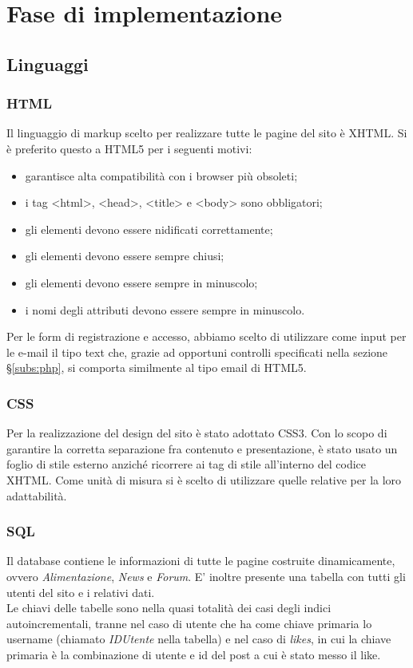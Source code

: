\section{Fase di implementazione}
\subsection{Linguaggi}
\subsubsection{HTML}
Il linguaggio di markup scelto per realizzare tutte le pagine del sito è XHTML. Si è preferito questo a HTML5 per i seguenti motivi:
\begin{itemize}
    \item garantisce alta compatibilità con i browser più obsoleti;
    \item i tag <html>, <head>, <title> e <body> sono obbligatori;
	\item gli elementi devono essere nidificati correttamente;
	\item gli elementi devono essere sempre chiusi;
	\item gli elementi devono essere sempre in minuscolo;
	\item i nomi degli attributi devono essere sempre in minuscolo.
\end{itemize}

Per le form di registrazione e accesso, abbiamo scelto di utilizzare come input per le e-mail il tipo text che, grazie ad opportuni controlli specificati nella sezione \S\ref{subs:php}, 
si comporta similmente al tipo email di HTML5.

\subsubsection{CSS}
Per la realizzazione del design del sito è stato adottato CSS3. 
Con lo scopo di garantire la corretta separazione fra contenuto e presentazione, è stato usato un foglio di stile esterno anziché ricorrere ai tag di stile all'interno del codice XHTML. 
Come unità di misura si è scelto di utilizzare quelle relative per la loro adattabilità.
\subsubsection{SQL}

Il database contiene le informazioni di tutte le pagine costruite dinamicamente, ovvero \textit{Alimentazione}, \textit{News} e \textit{Forum}. E' inoltre presente una tabella con tutti gli utenti del sito e i relativi dati.\\
Le chiavi delle tabelle sono nella quasi totalità dei casi degli indici autoincrementali, tranne nel caso di utente che ha come chiave primaria lo username (chiamato \textit{IDUtente} nella tabella) e nel caso di \textit{likes}, 
in cui la chiave primaria è la combinazione di utente e id del post a cui è stato messo il like.


